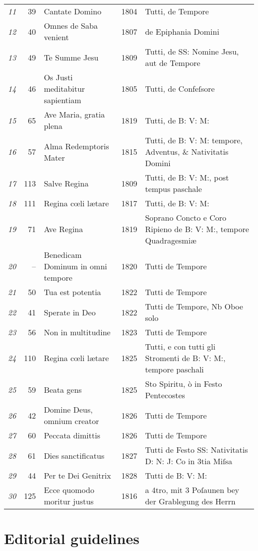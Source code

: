 \documentclass{ees}
\begin{document}
{\begin{xltabular}{\linewidth}{>{\itshape}rrlc X}
  11 &  39 & Cantate Domino & 1804 & Tutti, de Tempore\\
  12 &  40 & Omnes de Saba venient & 1807 & de Epiphania Domini\\
  13 &  49 & Te Summe Jesu & 1809 & Tutti, de SS: Nomine Jesu, aut de Tempore\\
  14 &  46 & Os Justi meditabitur sapientiam & 1805 & Tutti, de Confeſsore\\
  15 &  65 & Ave Maria, gratia plena & 1819 & Tutti, de B: V: M:\\
  16 &  57 & Alma Redemptoris Mater & 1815 & Tutti, de B: V: M: tempore, Adventus, \& Nativitatis Domini\\
  17 & 113 & Salve Regina & 1809 & Tutti, de B: V: M:, post tempus paschale\\
  18 & 111 & Regina cœli lætare & 1817 & Tutti, de B: V: M:\\
  19 &  71 & Ave Regina & 1819 & Soprano Concto e Coro Ripieno de B: V: M:, tempore Quadragesmiæ\\
  20 &   – & Benedicam Dominum in omni tempore & 1820 & Tutti de Tempore\\
  21 &  50 & Tua est potentia & 1822 & Tutti de Tempore\\
  22 &  41 & Sperate in Deo & 1822 & Tutti de Tempore, Nb Oboe solo\\
  23 &  56 & Non in multitudine & 1823 & Tutti de Tempore\\
  24 & 110 & Regina cœli lætare & 1825 & Tutti, e con tutti gli Stromenti de B: V: M:, tempore paschali\\
  25 &  59 & Beata gens & 1825 & Sto Spiritu, ò in Festo Pentecostes\\
  26 &  42 & Domine Deus, omnium creator & 1826 & Tutti de Tempore\\
  27 &  60 & Peccata dimittis & 1826 & Tutti de Tempore\\
  28 &  61 & Dies sanctificatus & 1827 & Tutti de Festo SS: Nativitatis D: N: J: Co in 3tia Miſsa\\
  29 &  44 & Per te Dei Genitrix & 1828 & Tutti de B: V: M:\\
  30 & 125 & Ecce quomodo moritur justus & 1816 & a 4tro, mit 3 Poſaunen bey der Grablegung des Herrn \\
  \bottomrule
\end{xltabular}}


\section{Editorial guidelines}
\end{document}
